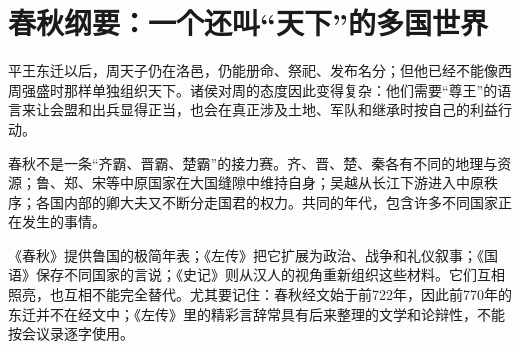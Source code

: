 \section{春秋纲要：一个还叫“天下”的多国世界}

平王东迁以后，周天子仍在洛邑，仍能册命、祭祀、发布名分；但他已经不能像西周强盛时那样单独组织天下。诸侯对周的态度因此变得复杂：他们需要“尊王”的语言来让会盟和出兵显得正当，也会在真正涉及土地、军队和继承时按自己的利益行动。

春秋不是一条“齐霸、晋霸、楚霸”的接力赛。齐、晋、楚、秦各有不同的地理与资源；鲁、郑、宋等中原国家在大国缝隙中维持自身；吴越从长江下游进入中原秩序；各国内部的卿大夫又不断分走国君的权力。共同的年代，包含许多不同国家正在发生的事情。

\begin{sourcenote}
《春秋》提供鲁国的极简年表；《左传》把它扩展为政治、战争和礼仪叙事；《国语》保存不同国家的言说；《史记》则从汉人的视角重新组织这些材料。它们互相照亮，也互相不能完全替代。尤其要记住：春秋经文始于前722年，因此前770年的东迁并不在经文中；《左传》里的精彩言辞常具有后来整理的文学和论辩性，不能按会议录逐字使用。
\end{sourcenote}
